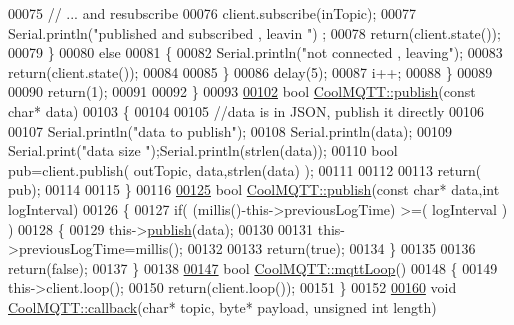 \begin{DoxyCode}
00075             \textcolor{comment}{// ... and resubscribe}
00076             client.subscribe(inTopic);
00077             Serial.println(\textcolor{stringliteral}{"published and subscribed , leavin "}) ;
00078             \textcolor{keywordflow}{return}(client.state());
00079         \}
00080         \textcolor{keywordflow}{else}
00081         \{
00082             Serial.println(\textcolor{stringliteral}{"not connected , leaving"});
00083             \textcolor{keywordflow}{return}(client.state());
00084             
00085         \}
00086     delay(5);
00087     i++;
00088     \}
00089     
00090     \textcolor{keywordflow}{return}(1);
00091 
00092 \}
00093 
\hyperlink{class_cool_m_q_t_t_ace977b3e90ab14b1199fe5c4fb0a13ec}{00102} \textcolor{keywordtype}{bool} \hyperlink{class_cool_m_q_t_t_ace977b3e90ab14b1199fe5c4fb0a13ec}{CoolMQTT::publish}(\textcolor{keyword}{const} \textcolor{keywordtype}{char}* data)
00103 \{
00104 
00105     \textcolor{comment}{//data is in JSON, publish it directly}
00106 
00107     Serial.println(\textcolor{stringliteral}{"data to publish"});
00108     Serial.println(data);
00109     Serial.print(\textcolor{stringliteral}{"data size "});Serial.println(strlen(data));
00110     \textcolor{keywordtype}{bool} pub=client.publish( outTopic, data,strlen(data) );
00111 
00112 
00113     \textcolor{keywordflow}{return}( pub);
00114 
00115 \}
00116 
\hyperlink{class_cool_m_q_t_t_a65a506641740ce797ceadd4fa8a286d3}{00125} \textcolor{keywordtype}{bool} \hyperlink{class_cool_m_q_t_t_ace977b3e90ab14b1199fe5c4fb0a13ec}{CoolMQTT::publish}(\textcolor{keyword}{const} \textcolor{keywordtype}{char}* data,\textcolor{keywordtype}{int} logInterval)
00126 \{
00127     \textcolor{keywordflow}{if}( (millis()-this->previousLogTime) >=( logInterval ) )
00128     \{
00129         this->\hyperlink{class_cool_m_q_t_t_ace977b3e90ab14b1199fe5c4fb0a13ec}{publish}(data);
00130 
00131         this->previousLogTime=millis();
00132 
00133         \textcolor{keywordflow}{return}(\textcolor{keyword}{true});
00134     \}
00135     
00136     \textcolor{keywordflow}{return}(\textcolor{keyword}{false});
00137 \}
00138 
\hyperlink{class_cool_m_q_t_t_aa5eaae967b562b62cbcf2b8d81f6e5d5}{00147} \textcolor{keywordtype}{bool} \hyperlink{class_cool_m_q_t_t_aa5eaae967b562b62cbcf2b8d81f6e5d5}{CoolMQTT::mqttLoop}()
00148 \{
00149     this->client.loop();
00150     \textcolor{keywordflow}{return}(client.loop());
00151 \}
00152 
\hyperlink{class_cool_m_q_t_t_a30d82ad665bfb603f46ecdbc290775df}{00160} \textcolor{keywordtype}{void} \hyperlink{class_cool_m_q_t_t_a30d82ad665bfb603f46ecdbc290775df}{CoolMQTT::callback}(\textcolor{keywordtype}{char}* topic, byte* payload, \textcolor{keywordtype}{unsigned} \textcolor{keywordtype}{int} length) 

\end{DoxyCode}

